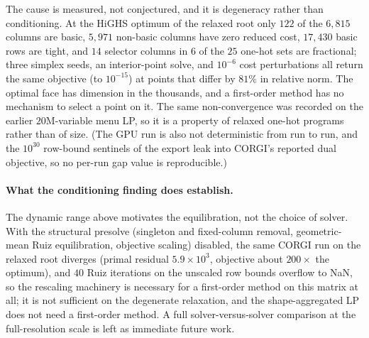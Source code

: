 The cause is measured, not conjectured, and it is degeneracy rather than
conditioning. At the HiGHS optimum of the relaxed root only $122$ of the
$6{,}815$ columns are basic, $5{,}971$ non-basic columns have zero reduced
cost, $17{,}430$ basic rows are tight, and $14$ selector columns in $6$ of the
$25$ one-hot sets are fractional; three simplex seeds, an interior-point solve,
and $10^{-6}$ cost perturbations all return the same objective (to $10^{-15}$)
at points that differ by $81\%$ in relative norm. The optimal face has
dimension in the thousands, and a first-order method has no mechanism to select
a point on it. The same non-convergence was recorded on the earlier
$20$M-variable menu LP, so it is a property of relaxed one-hot programs rather
than of size. (The GPU run is also not deterministic from run to run, and the
$10^{30}$ row-bound sentinels of the export leak into CORGI's reported dual
objective, so no per-run gap value is reproducible.)

\paragraph{What the conditioning finding does establish.}
The dynamic range above motivates the equilibration, not the choice of solver.
With the structural presolve (singleton and fixed-column removal,
geometric-mean Ruiz equilibration, objective scaling) disabled, the same CORGI
run on the relaxed root diverges (primal residual $5.9\times10^{3}$, objective
about $200\times$ the optimum), and $40$ Ruiz iterations on the unscaled row
bounds overflow to NaN, so the rescaling machinery is necessary for a
first-order method on this matrix at all; it is not sufficient on the
degenerate relaxation, and the shape-aggregated LP does not need a first-order
method. A full solver-versus-solver comparison at the full-resolution scale is
left as immediate future work.
